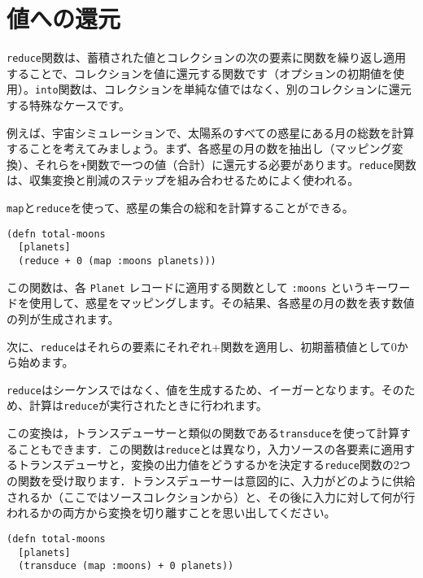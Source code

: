 \section{値への還元}

\texttt{reduce}関数は、蓄積された値とコレクションの次の要素に関数を繰り返し適用することで、コレクションを値に還元する関数です（オプションの初期値を使用）。\texttt{into}関数は、コレクションを単純な値ではなく、別のコレクションに還元する特殊なケースです。

例えば、宇宙シミュレーションで、太陽系のすべての惑星にある月の総数を計算することを考えてみましょう。まず、各惑星の月の数を抽出し（マッピング変換）、それらを\texttt{+}関数で一つの値（合計）に還元する必要があります。\texttt{reduce}関数は、収集変換と削減のステップを組み合わせるためによく使われる。

\texttt{map}と\texttt{reduce}を使って、惑星の集合の総和を計算することができる。



\begin{lstlisting}[numbers=none]
(defn total-moons
  [planets]
  (reduce + 0 (map :moons planets)))
\end{lstlisting}

この関数は、各 \texttt{Planet} レコードに適用する関数として \texttt{:moons} というキーワードを使用して、惑星をマッピングします。その結果、各惑星の月の数を表す数値の列が生成されます。

次に、\texttt{reduce}はそれらの要素にそれぞれ+関数を適用し、初期蓄積値として0から始めます。

\texttt{reduce}はシーケンスではなく、値を生成するため、イーガーとなります。そのため、計算は\texttt{reduce}が実行されたときに行われます。

この変換は，トランスデューサーと類似の関数である\texttt{transduce}を使って計算することもできます．この関数は\texttt{reduce}とは異なり，入力ソースの各要素に適用するトランスデューサと，変換の出力値をどうするかを決定する\texttt{reduce}関数の2つの関数を受け取ります．トランスデューサーは意図的に、入力がどのように供給されるか（ここではソースコレクションから）と、その後に入力に対して何が行われるかの両方から変換を切り離すことを思い出してください。



\begin{lstlisting}[numbers=none]
(defn total-moons
  [planets]
  (transduce (map :moons) + 0 planets))
\end{lstlisting}


